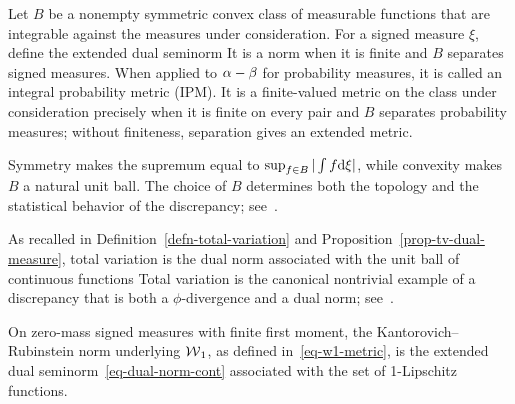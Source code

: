 \begin{defn}\label{def-dual-norm-ipm}
	Let $B$ be a nonempty symmetric convex class of measurable functions that are integrable against the measures under consideration. For a signed measure $\xi$, define the extended dual seminorm
	It is a norm when it is finite and $B$ separates signed measures. When applied to $\alpha-\beta$ for probability measures, it is called an integral probability metric (IPM). It is a finite-valued metric on the class under consideration precisely when it is finite on every pair and $B$ separates probability measures; without finiteness, separation gives an extended metric.
\end{defn}
Symmetry makes the supremum equal to $\sup_{f\in B}|\int f\mathrm{d}\xi|$, while convexity makes $B$ a natural unit ball. The choice of $B$ determines both the topology and the statistical behavior of the discrepancy; see~\cite{sriperumbudur2012empirical,sriperumbudur2009integral,sriperumbudur2008injective}.

\begin{example}
As recalled in Definition~\ref{defn-total-variation} and Proposition~\ref{prop-tv-dual-measure}, total variation is the dual norm associated with the unit ball of continuous functions
Total variation is the canonical nontrivial example of a discrepancy that is both a $\phi$-divergence and a dual norm; see~\cite{sriperumbudur2009integral}.
\end{example}

\begin{example}
On zero-mass signed measures with finite first moment, the Kantorovich--Rubinstein norm underlying $\operatorname{\mathcal{W}}_1$, as defined in~\eqref{eq-w1-metric}, is the extended dual seminorm~\eqref{eq-dual-norm-cont} associated with
the set of 1-Lipschitz functions.
\end{example}

